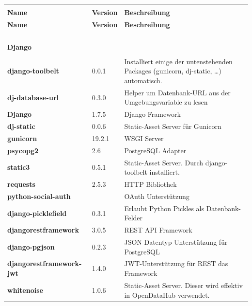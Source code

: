 \begin{tabularx}{\textwidth}{llX}
  \toprule\\
  \textbf{Name} & \textbf{Version} & \textbf{Beschreibung} \\
  \endfirsthead

  \textbf{Name} & \textbf{Version} & \textbf{Beschreibung} \\
  \midrule\\
  \endhead

  \midrule\\
  \endfoot

  \bottomrule\\
  \caption{Zur Laufzeit benötigte Python Module}
  \label{tab:sd:python-modules}
  \endlastfoot

  \midrule\\
  \multicolumn{3}{l}{\textbf{Django}}\\
  \midrule\\

  \textbf{django-toolbelt} & 0.0.1 & Installiert einige der untenstehenden Packages (gunicorn, dj-static, \dots) automatisch.\\
  \textbf{dj-database-url} & 0.3.0 & Helper um Datenbank-URL aus der Umgebungsvariable zu lesen\\
  \textbf{Django} & 1.7.5 & Django Framework\\
  \textbf{dj-static} & 0.0.6 & Static-Asset Server für Gunicorn\\
  \textbf{gunicorn} & 19.2.1 & WSGI Server\\
  \textbf{psycopg2} & 2.6 & PostgreSQL Adapter\\
  \textbf{static3} & 0.5.1 & Static-Asset Server. Durch django-toolbelt installiert.\\
  \textbf{requests} & 2.5.3 & HTTP Bibliothek\\
  
  \textbf{python-social-auth} &  & OAuth Unterstützung\\
  \textbf{django-picklefield} & 0.3.1 & Erlaubt Python Pickles als Datenbank-Felder\\
  \textbf{djangorestframework} & 3.0.5 & REST API Framework\\
  \textbf{django-pgjson} & 0.2.3 & JSON Datentyp-Unterstützung für PostgreSQL\\
  \textbf{djangorestframework-jwt} & 1.4.0 & JWT-Unterstützung für REST das Framework\\
  \textbf{whitenoise} & 1.0.6 & Static-Asset Server. Dieser wird effektiv in OpenDataHub verwendet.\\


\end{tabularx}
